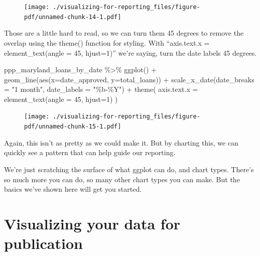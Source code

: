 \documentclass[
  letterpaper,
  DIV=11,
  numbers=noendperiod]{scrreprt}
\newenvironment{Shaded}{\begin{snugshade}}{\end{snugshade}}
\newcommand{\AttributeTok}[1]{\textcolor[rgb]{0.40,0.45,0.13}{#1}}
\newcommand{\DecValTok}[1]{\textcolor[rgb]{0.68,0.00,0.00}{#1}}
\newcommand{\FunctionTok}[1]{\textcolor[rgb]{0.28,0.35,0.67}{#1}}
\newcommand{\NormalTok}[1]{\textcolor[rgb]{0.00,0.23,0.31}{#1}}
\newcommand{\SpecialCharTok}[1]{\textcolor[rgb]{0.37,0.37,0.37}{#1}}
\newcommand{\StringTok}[1]{\textcolor[rgb]{0.13,0.47,0.30}{#1}}
\begin{document}
\begin{figure}[H]

{\centering \texttt{[image: ./visualizing-for-reporting\_files/figure-pdf/unnamed-chunk-14-1.pdf]}

}

\end{figure}

Those are a little hard to read, so we can turn them 45 degrees to
remove the overlap using the theme() function for styling. With
``axis.text.x = element\_text(angle = 45, hjust=1)'' we're saying, turn
the date labels 45 degrees.

\begin{Shaded}
\begin{Highlighting}[]
\NormalTok{ppp\_maryland\_loans\_by\_date }\SpecialCharTok{\%\textgreater{}\%}
  \FunctionTok{ggplot}\NormalTok{() }\SpecialCharTok{+}
  \FunctionTok{geom\_line}\NormalTok{(}\FunctionTok{aes}\NormalTok{(}\AttributeTok{x=}\NormalTok{date\_approved, }\AttributeTok{y=}\NormalTok{total\_loans)) }\SpecialCharTok{+}
  \FunctionTok{scale\_x\_date}\NormalTok{(}\AttributeTok{date\_breaks =} \StringTok{"1 month"}\NormalTok{, }\AttributeTok{date\_labels =} \StringTok{"\%b{-}\%Y"}\NormalTok{) }\SpecialCharTok{+}
  \FunctionTok{theme}\NormalTok{(}
    \AttributeTok{axis.text.x =} \FunctionTok{element\_text}\NormalTok{(}\AttributeTok{angle =} \DecValTok{45}\NormalTok{,  }\AttributeTok{hjust=}\DecValTok{1}\NormalTok{)}
\NormalTok{  )}
\end{Highlighting}
\end{Shaded}

\begin{figure}[H]

{\centering \texttt{[image: ./visualizing-for-reporting\_files/figure-pdf/unnamed-chunk-15-1.pdf]}

}

\end{figure}

Again, this isn't as pretty as we could make it. But by charting this,
we can quickly see a pattern that can help guide our reporting.

We're just scratching the surface of what ggplot can do, and chart
types. There's so much more you can do, so many other chart types you
can make. But the basics we've shown here will get you started.


\hypertarget{visualizing-your-data-for-publication}{%
\chapter{Visualizing your data for
publication}\label{visualizing-your-data-for-publication}}
\end{document}
